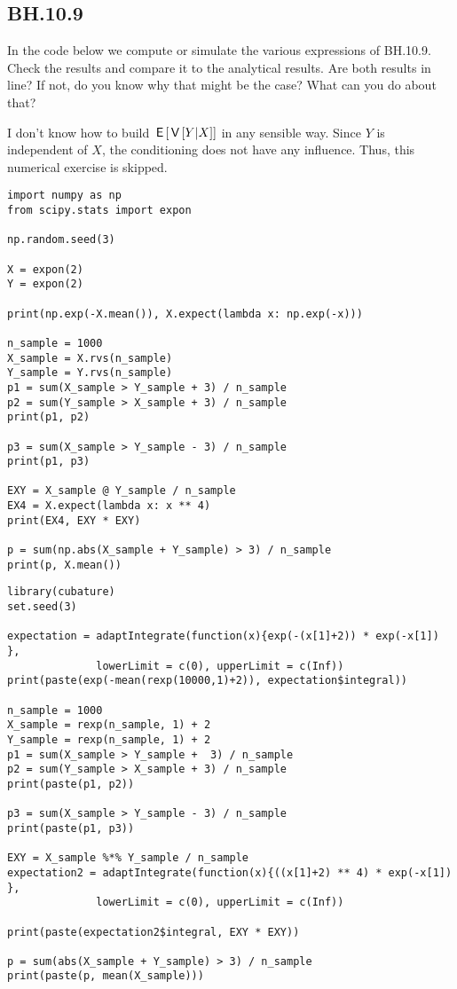 

\subsection{BH.10.9}


\begin{exercise}
In the code below we compute or simulate the various expressions of BH.10.9. Check the results and compare it to the analytical results. Are both results in line? If not, do you know why that might be the case? What can you do about that?

I don't know how to build $\,\mathsf{E}\left[\,\mathsf{V}\left[Y|X\right]\right]$ in any sensible way. Since $Y$ is independent of $X$, the conditioning does not have any influence. Thus, this numerical exercise is skipped.
\end{exercise}

\begin{verbatim}
import numpy as np
from scipy.stats import expon

np.random.seed(3)

X = expon(2)
Y = expon(2)

print(np.exp(-X.mean()), X.expect(lambda x: np.exp(-x)))

n_sample = 1000
X_sample = X.rvs(n_sample)
Y_sample = Y.rvs(n_sample)
p1 = sum(X_sample > Y_sample + 3) / n_sample
p2 = sum(Y_sample > X_sample + 3) / n_sample
print(p1, p2)

p3 = sum(X_sample > Y_sample - 3) / n_sample
print(p1, p3)

EXY = X_sample @ Y_sample / n_sample
EX4 = X.expect(lambda x: x ** 4)
print(EX4, EXY * EXY)

p = sum(np.abs(X_sample + Y_sample) > 3) / n_sample
print(p, X.mean())
\end{verbatim}

\begin{verbatim}
library(cubature)   
set.seed(3)

expectation = adaptIntegrate(function(x){exp(-(x[1]+2)) * exp(-x[1]) },
              lowerLimit = c(0), upperLimit = c(Inf))
print(paste(exp(-mean(rexp(10000,1)+2)), expectation$integral))

n_sample = 1000
X_sample = rexp(n_sample, 1) + 2
Y_sample = rexp(n_sample, 1) + 2
p1 = sum(X_sample > Y_sample +  3) / n_sample
p2 = sum(Y_sample > X_sample + 3) / n_sample
print(paste(p1, p2))

p3 = sum(X_sample > Y_sample - 3) / n_sample
print(paste(p1, p3))

EXY = X_sample %*% Y_sample / n_sample
expectation2 = adaptIntegrate(function(x){((x[1]+2) ** 4) * exp(-x[1]) }, 
              lowerLimit = c(0), upperLimit = c(Inf))

print(paste(expectation2$integral, EXY * EXY))

p = sum(abs(X_sample + Y_sample) > 3) / n_sample
print(paste(p, mean(X_sample)))
\end{verbatim}


